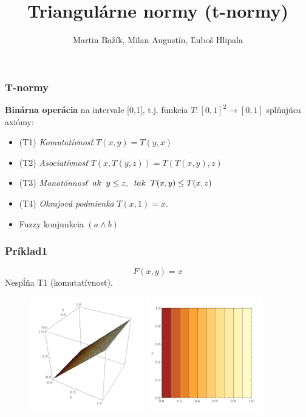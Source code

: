 \documentclass{beamer}
\title{Triangulárne normy (t-normy)}
\author{Martin Bažík, Milan Augustín, Ľuboš Hlipala}
\begin{document}
\begin{frame}
	\maketitle
\end{frame}

\begin{frame}
  \frametitle{T-normy}
  \begin{definition}
  	\textbf{Binárna operácia} na intervale [0,1], t.j. funkcia $T : [0,1]^2 \rightarrow [0,1]$ splňujúca axiómy:
  	\begin{itemize}
  		\item (T1) {\em Komutatívnosť}
		$T(x,y)=T(y,x)$
		\item (T2) {\em Asociatívnosť}
		$T(x,T(y,z))=T(T(x,y),z)$
		\item (T3) {\em Monotónnosť}
		$ ak \hskip 2mm y\le z, \hskip 2mm tak \hskip 2mm T(x,y)\le T(x,z)$
		\item (T4) {\em Okrajová podmienka}
		$T(x,1)=x.$
	\end{itemize}
  \end{definition}
  \begin{itemize}
  	\item Fuzzy konjunkcia $(a\land b)$  	
  \end{itemize}
\end{frame}

\begin{frame}
\frametitle{Príklad1}
$$ F(x,y)=x$$
Nespĺňa T1 (komutatívnosť).
\begin{figure}
\includegraphics[width=5cm]{functionx}
\includegraphics[width=5cm]{functionx2}
\end{figure}
\end{frame}
\end{document}
